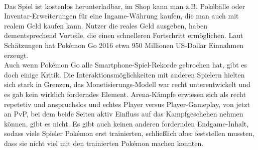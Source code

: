 \documentclass[extern,palatino]{cgBA}
\begin{document}
\\Das Spiel ist kostenlos herunterladbar, im Shop kann man z.B. Pokébälle oder Inventar-Erweiterungen für eine Ingame-Währung kaufen, die man auch mit realem Geld kaufen kann. Nutzer die reales Geld ausgeben, haben dementsprechend Vorteile, die einen schnelleren Fortschritt ermöglichen. Laut Schätzungen hat Pokémon Go 2016 etwa 950 Millionen US-Dollar Einnahmen erzeugt.%
\\Auch wenn Pokémon Go alle Smartphone-Spiel-Rekorde gebrochen hat, gibt es doch einige Kritik. Die Interaktionsmöglichkeiten mit anderen Spielern hielten sich stark in Grenzen, das Monetisierungs-Modell war recht unterentwickelt und es gab kein wirklich forderndes Element. Arena-Kämpfe erwiesen sich als recht repetetiv und anspruchslos und echtes Player versus Player-Gameplay, von jetzt an PvP, bei dem beide Seiten aktiv Einfluss auf das Kampfgeschehen nehmen können, gibt es nicht. Es gibt auch keinen anderen fordernden Endgame-Inhalt, sodass viele Spieler Pokémon erst trainierten, schließlich aber feststellen mussten, dass sie nicht viel mit den trainierten Pokémon machen konnten. %
\newpage
\end{document}
